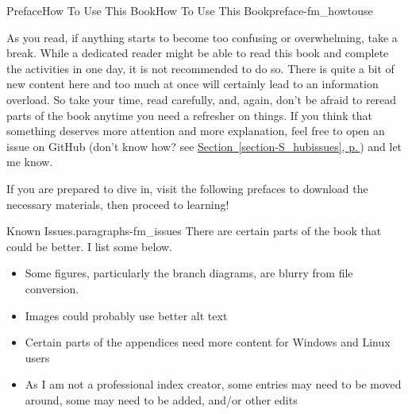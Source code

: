 \documentclass[twoside,10pt,]{book}
\newcommand{\xreffont}{\relax}
\begin{document}
\begin{preface}{Preface}{How To Use This Book}{}{How To Use This Book}{}{}{preface-fm_howtouse}
\par
As you read, if anything starts to become too confusing or overwhelming, take a break. While a dedicated reader might be able to read this book and complete the activities in one day, it is not recommended to do so. There is quite a bit of new content here and too much at once will certainly lead to an information overload. So take your time, read carefully, and, again, don't be afraid to reread parts of the book anytime you need a refresher on things. If you think that something deserves more attention and more explanation, feel free to open an issue on GitHub (don't know how? see \hyperref[section-S_hubissues]{Section~{\xreffont\ref{section-S_hubissues}}, p.\,\pageref{section-S_hubissues}}) and let me know.%
\par
If you are prepared to dive in, visit the following prefaces to download the necessary materials, then proceed to learning!%
\begin{paragraphs}{Known Issues.}{paragraphs-fm_issues}%
There are certain parts of the book that could be better. I list some below.%
\begin{itemize}[label=\textbullet]
\item{}Some figures, particularly the branch diagrams, are blurry from file conversion.%
\item{}Images could probably use better alt text%
\item{}Certain parts of the appendices need more content for Windows and Linux users%
\item{}As I am not a professional index creator, some entries may need to be moved around, some may need to be added, and\slash{}or other edits%
\end{itemize}
%
\end{paragraphs}%
\end{preface}
%
%
\typeout{************************************************}
\typeout{************************************************}
%
\end{document}
